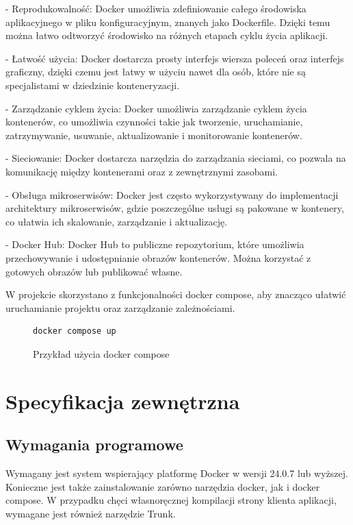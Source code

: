 \documentclass[a4paper,twoside,12pt]{book}
\begin{document}
- Reprodukowalność:
    Docker umożliwia zdefiniowanie całego środowiska aplikacyjnego w pliku konfiguracyjnym, znanych jako Dockerfile. Dzięki temu można łatwo odtworzyć środowisko na różnych etapach cyklu życia aplikacji.

- Łatwość użycia:
    Docker dostarcza prosty interfejs wiersza poleceń oraz interfejs graficzny, dzięki czemu jest łatwy w użyciu nawet dla osób, które nie są specjalistami w dziedzinie konteneryzacji.

- Zarządzanie cyklem życia:
    Docker umożliwia zarządzanie cyklem życia kontenerów, co umożliwia czynności takie jak tworzenie, uruchamianie, zatrzymywanie, usuwanie, aktualizowanie i monitorowanie kontenerów.

- Sieciowanie:
    Docker dostarcza narzędzia do zarządzania sieciami, co pozwala na komunikację między kontenerami oraz z zewnętrznymi zasobami.

- Obsługa mikroserwisów:
        Docker jest często wykorzystywany do implementacji architektury mikroserwisów, gdzie poszczególne usługi są pakowane w kontenery, co ułatwia ich skalowanie, zarządzanie i aktualizację.

- Docker Hub:
    Docker Hub to publiczne repozytorium, które umożliwia przechowywanie i udostępnianie obrazów kontenerów. Można korzystać z gotowych obrazów lub publikować własne.

W projekcie skorzystano z funkcjonalności docker compose, aby znacząco ułatwić uruchamianie projektu oraz zarządzanie zależnościami.

\begin{figure}[H]
\centering
\begin{lstlisting}
docker compose up
\end{lstlisting}
\caption{Przykład użycia docker compose}
\label{fig:pseudokod:listings}
\end{figure}


\chapter{Specyfikacja zewnętrzna}
\label{ch:04}

\section{Wymagania programowe}

Wymagany jest system wspierający platformę Docker w wersji 24.0.7 lub wyższej.
Konieczne jest także zainstalowanie zarówno narzędzia docker, jak i docker compose.
W przypadku chęci własnoręcznej kompilacji strony klienta aplikacji, wymagane jest również
narzędzie Trunk.
\end{document}
